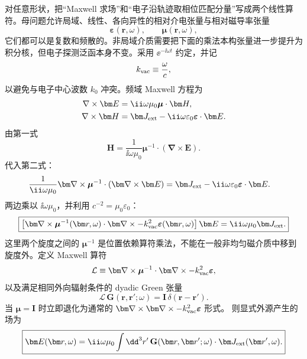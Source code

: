 对任意形状，把“Maxwell 求场”和“电子沿轨迹取相位匹配分量”写成两个线性算符。母问题允许局域、线性、各向异性的相对介电张量与相对磁导率张量
\begin{equation}
 \boldsymbol\varepsilon(\bm r,\omega),
 \qquad
 \boldsymbol\mu(\bm r,\omega),
\end{equation}
它们都可以是复数和频散的。非局域介质需要把下面的乘法本构张量进一步提升为积分核，但电子探测泛函本身不变。采用 $\ee^{-\ii\omega t}$ 约定，并记
\begin{equation}
k_{\rm vac}\equiv\frac{\omega}{c},
\end{equation}
以避免与电子中心波数 $k_0$ 冲突。频域 Maxwell 方程为
\begin{align}
\nabla\times\bm E
&=\ii\omega\mu_0\boldsymbol\mu\cdot\bm H,
\label{eq:maxwell-curl-E-general}\\
\nabla\times\bm H
&=\bm J_{\rm ext}
-\ii\omega\varepsilon_0\boldsymbol\varepsilon\cdot\bm E.
\label{eq:maxwell-curl-H-general}
\end{align}
由第一式
\begin{equation}
 \bm H
 =\frac{1}{\ii\omega\mu_0}
 \boldsymbol\mu^{-1}\cdot(\bm\nabla\times\bm E).
\end{equation}
代入第二式：
\begin{align}
\frac{1}{\ii\omega\mu_0}
\bm\nabla\times
\boldsymbol\mu^{-1}\cdot(\bm\nabla\times\bm E)
&=\bm J_{\rm ext}
-\ii\omega\varepsilon_0\boldsymbol\varepsilon\cdot\bm E.
\end{align}
两边乘以 $\ii\omega\mu_0$，并利用 $c^{-2}=\mu_0\varepsilon_0$：
\begin{equation}
 \boxed{
 \left[
 \bm\nabla\times\boldsymbol\mu^{-1}(\bm r,\omega)\cdot\bm\nabla\times
 -k_{\rm vac}^2\boldsymbol\varepsilon(\bm r,\omega)
 \right]\bm E
 =\ii\omega\mu_0\bm J_{\rm ext}.}
 \label{eq:Maxwell_general}
\end{equation}
这里两个旋度之间的 $\boldsymbol\mu^{-1}$ 是位置依赖算符乘法，不能在一般非均匀磁介质中移到旋度外。定义 Maxwell 算符
\begin{equation}
 \mathcal L
 \equiv
 \bm\nabla\times\boldsymbol\mu^{-1}\cdot\bm\nabla\times
 -k_{\rm vac}^2\boldsymbol\varepsilon,
 \label{eq:general-maxwell-operator}
\end{equation}
以及满足相同外向辐射条件的 dyadic Green 张量
\begin{equation}
\boxed{
\mathcal L\,\mathbf G(\bm r,\bm r';\omega)
=\mathbf I\,\delta(\bm r-\bm r').}
\label{eq:dyadicGreenDef}
\end{equation}
当 $\boldsymbol\mu=\mathbf I$ 时立即退化为通常的
$\bm\nabla\times\bm\nabla\times-k_{\rm vac}^2\boldsymbol\varepsilon$ 形式。
则显式外源产生的场为
\begin{equation}
\boxed{
\bm E(\bm r,\omega)
=\ii\omega\mu_0
\int\dd^3r'\,\mathbf G(\bm r,\bm r';\omega)\cdot\bm J_{\rm ext}(\bm r',\omega).}
\label{eq:E_GJ}
\end{equation}



